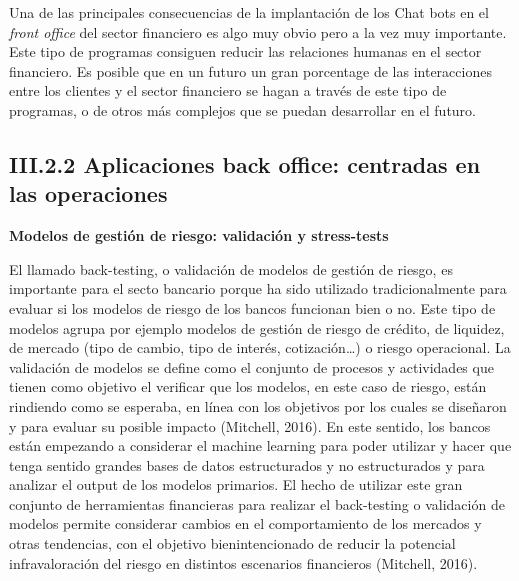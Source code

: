 \documentclass[]{DissertateUSU}
\begin{document}
\noindent Una de las principales consecuencias de la implantación de los
Chat bots en el \emph{front office} del sector financiero es algo muy
obvio pero a la vez muy importante. Este tipo de programas consiguen
reducir las relaciones humanas en el sector financiero. Es posible que
en un futuro un gran porcentage de las interacciones entre los clientes
y el sector financiero se hagan a través de este tipo de programas, o de
otros más complejos que se puedan desarrollar en el futuro.

\setlength\parskip{5ex}

\FloatBarrier
\newpage
{}
\fancyfoot[C]{\thepage}

\subsection{III.2.2 \textbf{Aplicaciones back office: centradas en las operaciones}}

\justifying

\textbf{Modelos de gestión de riesgo: validación y stress-tests}

\noindent El llamado back-testing, o validación de modelos de gestión de
riesgo, es importante para el secto bancario porque ha sido utilizado
tradicionalmente para evaluar si los modelos de riesgo de los bancos
funcionan bien o no. Este tipo de modelos agrupa por ejemplo modelos de
gestión de riesgo de crédito, de liquidez, de mercado (tipo de cambio,
tipo de interés, cotización\ldots{}) o riesgo operacional. La validación
de modelos se define como el conjunto de procesos y actividades que
tienen como objetivo el verificar que los modelos, en este caso de
riesgo, están rindiendo como se esperaba, en línea con los objetivos por
los cuales se diseñaron y para evaluar su posible impacto (Mitchell,
2016). En este sentido, los bancos están empezando a considerar el
machine learning para poder utilizar y hacer que tenga sentido grandes
bases de datos estructurados y no estructurados y para analizar el
output de los modelos primarios. El hecho de utilizar este gran conjunto
de herramientas financieras para realizar el back-testing o validación
de modelos permite considerar cambios en el comportamiento de los
mercados y otras tendencias, con el objetivo bienintencionado de reducir
la potencial infravaloración del riesgo en distintos escenarios
financieros (Mitchell, 2016).

\setlength\parskip{5ex}
\end{document}
